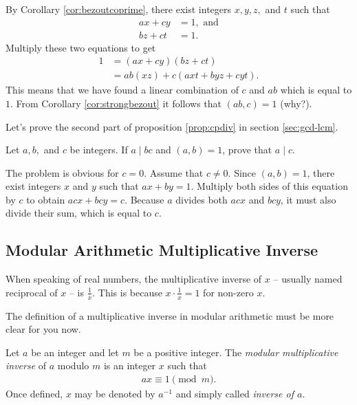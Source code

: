 \documentclass{subfile}
\begin{document}
	\begin{solution}
		By Corollary \ref{cor:bezoutcoprime}, there exist integers $x,y,z,$ and $t$ such that
			\begin{align*}
				ax+cy&=1, \text{ and}\\
				bz+ct&=1.
			\end{align*}
		Multiply these two equations to get
			\begin{align*}
				1 &= (ax+cy)(bz+ct)\\
				  &= ab(xz)+c(axt+byz+cyt).
			\end{align*}
		This means that we have found a linear combination of $c$ and $ab$ which is equal to $1$. From Corollary \ref{cor:strongbezout} it follows that $(ab,c)=1$ (why?).
	\end{solution}

	Let's prove the second part of proposition \eqref{prop:cpdiv} in section \eqref{sec:gcd-lcm}.

	\begin{problem}\label{prob:a|bc}
		Let $a,b,$ and $c$ be integers. If $a\mid bc$ and $(a,b)=1$, prove that $a\mid c$.
	\end{problem}

	\begin{solution}
		The problem is obvious for $c=0$. Assume that $c \neq 0$. Since $(a,b)=1$, there exist integers $x$ and $y$ such that $ax+by=1$. Multiply both sides of this equation by $c$ to obtain $acx+bcy=c$. Because $a$ divides both $acx$ and $bcy$, it must also divide their sum, which is equal to $c$.

	\end{solution}

	\subsection{Modular Arithmetic Multiplicative Inverse}\label{sec:arithinverse}

	When speaking of real numbers, the multiplicative inverse of $x$ -- usually named reciprocal of $x$ -- is $\frac{1}{x}$. This is because $x \cdot \frac{1}{x} = 1$ for non-zero $x$.

	The definition of a multiplicative inverse in modular arithmetic must be more clear for you now.

	\begin{definition}
		Let $a$ be an integer and let $m$ be a positive integer. The \textit{modular multiplicative inverse} of $a$ modulo $m$ is an integer $x$ such that
		\begin{align*}
		ax \equiv 1 \pmod m.
		\end{align*}
		Once defined, $x$ may be denoted by $a^{-1}$ and simply called \textit{inverse of $a$}.
	\end{definition}
\end{document}
